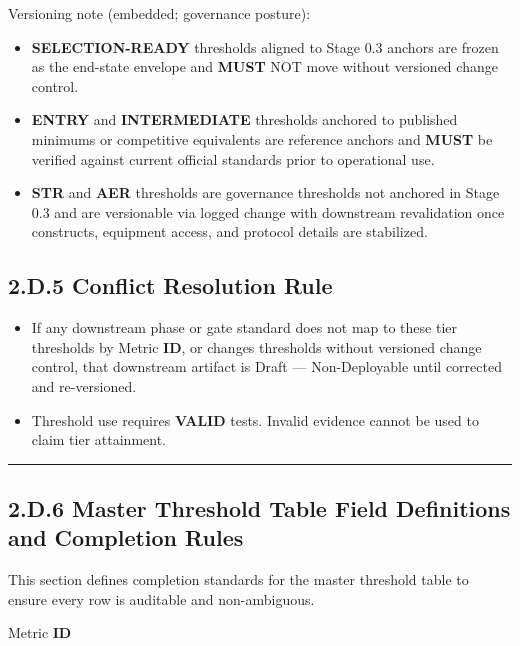 \documentclass[10pt]{article}
\newcommand{\SubTitleLine}{\textcolor{RuleGray}{\rule{0.98\linewidth}{0.65pt}}}
\begin{document}
Versioning note (embedded; governance posture):

\begin{itemize}
\item \textbf{SELECTION-READY} thresholds aligned to Stage 0.3 anchors are frozen as the end-state envelope and \textbf{MUST} NOT move without versioned change control.
\item \textbf{ENTRY} and \textbf{INTERMEDIATE} thresholds anchored to published minimums or competitive equivalents are reference anchors and \textbf{MUST} be verified against current official standards prior to operational use.
\item \textbf{STR} and \textbf{AER} thresholds are governance thresholds not anchored in Stage 0.3 and are versionable via logged change with downstream revalidation once constructs, equipment access, and protocol details are stabilized.
\end{itemize}

\clearpage
\subsection*{2.D.5 Conflict Resolution Rule}
{}

\begin{itemize}
\item If any downstream phase or gate standard does not map to these tier thresholds by Metric \textbf{ID}, or changes thresholds without versioned change control, that downstream artifact is Draft — Non-Deployable until corrected and re-versioned.
\item Threshold use requires \textbf{VALID} tests. Invalid evidence cannot be used to claim tier attainment.
\end{itemize}

\SubTitleLine

\subsection*{2.D.6 Master Threshold Table Field Definitions and Completion Rules}
{}

This section defines completion standards for the master threshold table to ensure every row is auditable and non-ambiguous.

Metric \textbf{ID}
\end{document}
